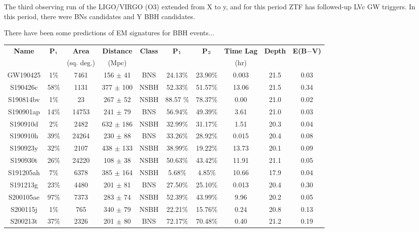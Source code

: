 The third observing run of the LIGO/VIRGO (O3) extended from X to y, and for this period ZTF has followed-up LVc GW triggers. In this period, there were BNs candidates and Y BBH candidates.

There have been some predictions of EM signatures for BBH events...

\begin{table*}
	\centering
	\begin{tabular}{||c c c c c c c c c c||} 
		\hline
		\textbf{Name} & \textbf{P$_{\textup{t}}$} & \textbf{Area} & \textbf{Distance} & \textbf{Class} & \textbf{P$_{\textup{1}}$} & \textbf{P$_{\textup{2}}$} & \textbf{Time Lag} & \textbf{Depth} & \textbf{E(B$-$V)}\\
		&&(sq. deg.)&(Mpc)&&&&(hr)&&\\
		\hline
		GW190425 &  1\% & 7461  & 156 $\pm$ 41& BNS & 24.13\%  & 23.90\%  & 0.003& 21.5 & 0.03\\
		S190426c & 58\% & 1131  & 377 $\pm$ 100 & NSBH & 52.33\%  & 51.57\% & 13.06& 21.5 & 0.34\\
		S190814bv & 1\% & 23  & 267 $\pm$ 52 & NSBH & 88.57 \%  &  78.37\%  & 0.00 & 21.0 & 0.02\\ %
		S190901ap & 14\% & 14753  & 241 $\pm$ 79  & BNS & 56.94\% & 49.39\%  & 3.61& 21.0 & 0.03\\
		S190910d & 2\% & 2482 & 632 $\pm$ 186  & NSBH & 32.99\% & 31.17\%& 1.51& 20.3 & 0.04\\
		S190910h & 39\% & 24264 & 230 $\pm$ 88 & BNS & 33.26\%  & 28.92\% & 0.015& 20.4 & 0.08\\
		S190923y & 32\% & 2107  & 438 $\pm$ 133& NSBH & 38.99\%  & 19.22\% & 13.73& 20.1 & 0.09\\
		S190930t & 26\% & 24220  & 108 $\pm$ 38 & NSBH & 50.63\% & 43.42\% & 11.91& 21.1 & 0.05\\
		S191205ah & 7\% & 6378  & 385 $\pm$ 164  & NSBH & 5.68\% & 4.85\% & 10.66& 17.9 & 0.04\\
		S191213g & 23\% & 4480 & 201 $\pm$ 81  & BNS & 27.50\%  & 25.10\% & 0.013& 20.4 & 0.30\\
		S200105ae & 97\%& 7373  & 283 $\pm$ 74  & NSBH & 52.39\% & 43.99\%  & 9.96 & 20.2 & 0.05\\
		S200115j & 1\% & 765 & 340 $\pm$ 79 & NSBH & 22.21\% & 15.76\%  & 0.24 & 20.8 & 0.13\\
		S200213t & 37\% & 2326  & 201 $\pm$ 80& BNS & 72.17\% & 70.48\%  & 0.40 & 21.2 & 0.19\\
		\hline
	\end{tabular}

\end{table*}
